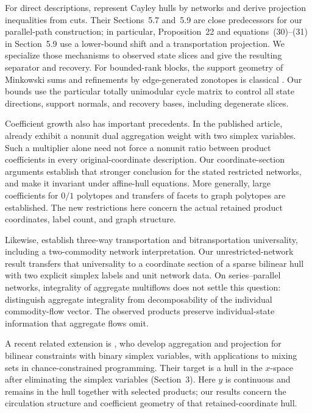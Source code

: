 For direct descriptions, \citet{KisHorvath2022} represent Cayley hulls by
networks and derive projection inequalities from cuts. Their Sections~5.7
and~5.9 are close predecessors for our parallel-path construction; in
particular, Proposition~22 and equations~(30)--(31) in Section~5.9 use a
lower-bound shift and a transportation projection. We specialize those
mechanisms to observed state slices and give the resulting separator and
recovery. For bounded-rank blocks, the support geometry of Minkowski sums
and refinements by edge-generated zonotopes is classical
\citep{GritzmannSturmfels1993,OnnRothblum2004}. Our bounds use the particular
totally unimodular cycle matrix to control all state directions, support
normals, and recovery bases, including degenerate slices.

Coefficient growth also has important precedents. In the published article, \citet[Example~2]{KhademniaDavarnia2025} already exhibit a nonunit dual aggregation
weight with two simplex variables. Such a multiplier alone need not force
a nonunit ratio between product coefficients in every original-coordinate
description. Our coordinate-section arguments establish that stronger
conclusion for the stated restricted networks, and make it invariant under
affine-hull equations. More generally, large coefficients for $0/1$ polytopes
\citep{AlonVu1997} and transfers of facets to graph polytopes
\citep{Fiorini2006} are established. The new restrictions here concern the
actual retained product coordinates, label count, and graph structure.

Likewise, \citet[Theorems~1.1 and~1.2]{DeLoeraOnn2006} establish
three-way transportation and bitransportation universality, including a
two-commodity network interpretation. Our unrestricted-network result
transfers that universality to a coordinate section of a sparse bilinear
hull with two explicit simplex labels and unit network data. On
series--parallel networks, integrality of aggregate multiflows does not
settle this question: \citet[Remark~1]{AlmoghrabiSkutellaWarode2026}
distinguish aggregate integrality from decomposability of the individual
commodity-flow vector. The observed products preserve individual-state
information that aggregate flows omit.

A recent related extension is \citet{DavarniaRahimian2026}, who develop
aggregation and projection for bilinear constraints with binary simplex
variables, with applications to mixing sets in chance-constrained
programming. Their target is a hull in the $x$-space after eliminating the
simplex variables (Section~3). Here $y$ is continuous and remains in the
hull together with selected products; our results concern the circulation
structure and coefficient geometry of that retained-coordinate hull.

